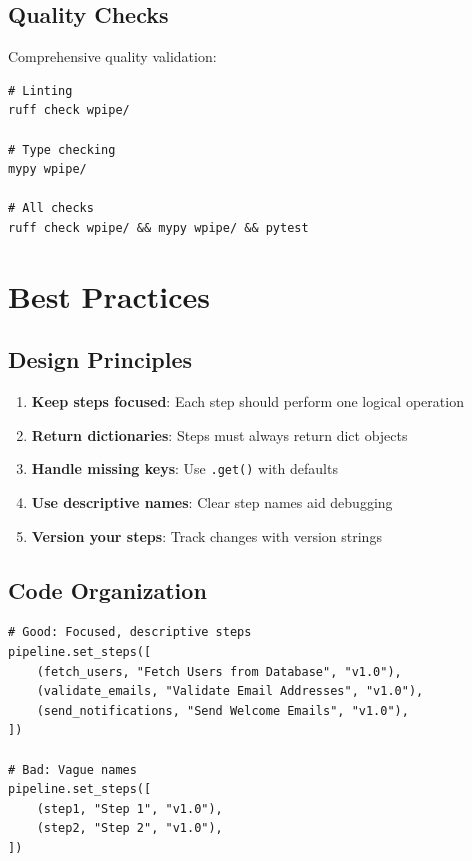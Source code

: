 \documentclass[12pt,a4paper]{report}
\newcommand{\code}[1]{\texttt{\fontfamily{pcr}\selectfont #1}}
\begin{document}
\section{Quality Checks}

Comprehensive quality validation:

\begin{lstlisting}[caption={Quality Checks}, label={lst:quality}]
# Linting
ruff check wpipe/

# Type checking
mypy wpipe/

# All checks
ruff check wpipe/ && mypy wpipe/ && pytest
\end{lstlisting}

\chapter{Best Practices}
\cleardoublepage

\section{Design Principles}

\begin{enumerate}
    \item \textbf{Keep steps focused}: Each step should perform one logical operation
    \item \textbf{Return dictionaries}: Steps must always return dict objects
    \item \textbf{Handle missing keys}: Use \code{.get()} with defaults
    \item \textbf{Use descriptive names}: Clear step names aid debugging
    \item \textbf{Version your steps}: Track changes with version strings
\end{enumerate}

\section{Code Organization}

\begin{lstlisting}[caption={Code Organization}, label={lst:organization}]
# Good: Focused, descriptive steps
pipeline.set_steps([
    (fetch_users, "Fetch Users from Database", "v1.0"),
    (validate_emails, "Validate Email Addresses", "v1.0"),
    (send_notifications, "Send Welcome Emails", "v1.0"),
])

# Bad: Vague names
pipeline.set_steps([
    (step1, "Step 1", "v1.0"),
    (step2, "Step 2", "v1.0"),
])
\end{lstlisting}
\end{document}
